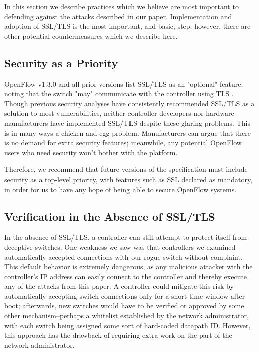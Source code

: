 In this section we describe practices which we believe are most important to defending against the attacks described in our paper. Implementation and adoption of SSL/TLS is the most important, and basic, step; however, there are other potential countermeasures which we describe here.

\subsection{Security as a Priority}

OpenFlow v1.3.0 and all prior versions list SSL/TLS as an "optional" feature, noting that the switch "may" communicate with the controller using TLS \cite{ietf}. Though previous security analyses have consistently recommended SSL/TLS as a solution to most vulnerabilities, neither controller developers nor hardware manufacturers have implemented SSL/TLS despite these glaring problems. This is in many ways a chicken-and-egg problem. Manufacturers can argue that there is no demand for extra security features; meanwhile, any potential OpenFlow users who need security won't bother with the platform.

Therefore, we recommend that future versions of the specification must include security as a top-level priority, with features such as SSL declared as mandatory, in order for us to have any hope of being able to secure OpenFlow systems. 

\subsection{Verification in the Absence of SSL/TLS}

In the absence of SSL/TLS,  a controller can still attempt to protect itself from deceptive switches. One weakness we saw was that controllers we examined automatically accepted connections with our rogue switch without complaint. This default behavior is extremely dangerous, as any malicious attacker with the controller's IP address can easily connect to the controller and thereby execute any of the attacks from this paper. A controller could mitigate this risk by automatically accepting switch connections only for a short time window after boot; afterwards, new switches would have to be verified or approved by some other mechanism--perhaps a whitelist established by the network administrator, with each switch being assigned some sort of hard-coded datapath ID. However, this approach has the drawback of requiring extra work on the part of the network administrator.

